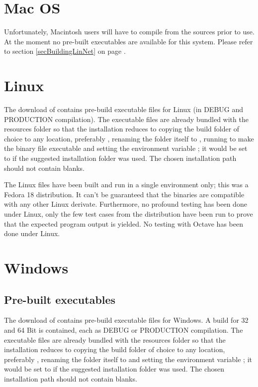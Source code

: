 \section{Mac OS}

Unfortunately, Macintosh users will have to compile \linnet{} from the
sources prior to use. At the moment no pre-built executables are available
for this system. Please refer to section \ref{secBuildingLinNet} on page
\pageref{secBuildingLinNet}.


\section{Linux}

The download of \linnet{} contains pre-build executable files for Linux
(in DEBUG and PRODUCTION compilation). The executable files are already
bundled with the resources folder  so that the installation
reduces to copying the build folder of choice to any location, preferably
, renaming the folder itself to \file{\linnet{}}, running
 to make the binary file executable and setting the
environment variable ; it would be set to
 if the suggested installation folder was
used. The chosen installation path should not contain blanks.

The Linux files have been built and run in a single environment only; this
was a Fedora 18 distribution. It can't be guaranteed that the binaries are
compatible with any other Linux derivate. Furthermore, no profound testing
has been done under Linux, only the few test cases from the distribution
have been run to prove that the expected program output is yielded. No
testing with Octave has been done under Linux.


\section{Windows}

\subsection{Pre-built executables}

The download of \linnet{} contains pre-build executable files for Windows.
A build for 32 and 64 Bit is contained, each as DEBUG or PRODUCTION
compilation. The executable files are already bundled with the resources
folder  so that the installation reduces to copying the
build folder of choice to any location, preferably
, renaming the folder itself to
\file{\linnet{}} and setting the environment variable ;
it would be set to  if the
suggested installation folder was used. The chosen installation path
should not contain blanks.


